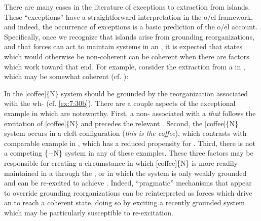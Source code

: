 {  \ea\label{ex:7:29}
  \label{ex:7:29a}
  \label{ex:7:29b}
  \label{ex:7:29c}
  \z
  \z
  
  There are many cases in the literature of exceptions to extraction from islands. These “exceptions” have a straightforward interpretation in the o/el framework, and indeed, the occurrence of exceptions is a basic prediction of the o/el account. Specifically, once we recognize that islands arise from grounding reorganizations, and that  forces can act to maintain systems in an , it is expected that states which would otherwise be non-coherent can be coherent when there are factors which work toward that end. For example, consider the extraction from a  in , which may be somewhat coherent (cf. \citep{Erteschik-ShirLappin1979,Truswell2011}):

\ea  \label{ex:7:30}
\z
\z

In  the [coffee]\{N\} system should be grounded by the reorganization associated with the wh- (cf. \ref{ex:7:30b}). There are a couple aspects of the exceptional example in  which are noteworthy. First, a non- associated with a \textit{that}  follows the excitation of [coffee]\{N\} and precedes the relevant . Second, the [coffee]\{N\} system occurs in a cleft configuration (\textit{this is the coffee}), which contrasts with comparable example in , which has a reduced propensity for . Third, there is not a competing \{−N\} system in any of these examples. These three factors may be responsible for creating a circumstance in which [coffee]\{N\} is more readily maintained in a  through the , or in which the system is only weakly grounded and can be re-excited to achieve . Indeed, “pragmatic” mechanisms that appear to override grounding reorganizations can be reinterpreted as forces which drive an  to reach a coherent state, doing so by exciting a recently grounded system which may be particularly susceptible to re-excitation.

}
